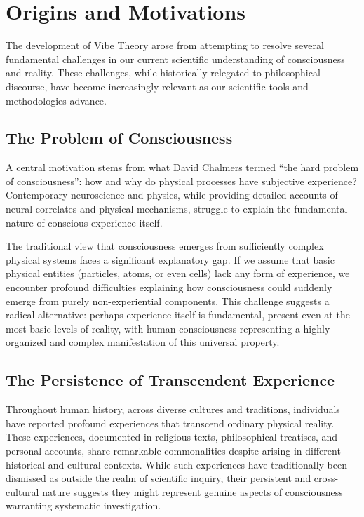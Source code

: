\documentclass{article}
\theoremstyle{definition}
\theoremstyle{axiom}
\theoremstyle{theorem}
\theoremstyle{lemma}
\theoremstyle{proposition}
\begin{document}
\section{Origins and Motivations}

The development of Vibe Theory arose from attempting to resolve several fundamental challenges in our current scientific understanding of consciousness and reality. These challenges, while historically relegated to philosophical discourse, have become increasingly relevant as our scientific tools and methodologies advance.

\subsection{The Problem of Consciousness}

A central motivation stems from what David Chalmers termed \enquote{the hard problem of consciousness}: how and why do physical processes have subjective experience? Contemporary neuroscience and physics, while providing detailed accounts of neural correlates and physical mechanisms, struggle to explain the fundamental nature of conscious experience itself.

The traditional view that consciousness emerges from sufficiently complex physical systems faces a significant explanatory gap. If we assume that basic physical entities (particles, atoms, or even cells) lack any form of experience, we encounter profound difficulties explaining how consciousness could suddenly emerge from purely non-experiential components. This challenge suggests a radical alternative: perhaps experience itself is fundamental, present even at the most basic levels of reality, with human consciousness representing a highly organized and complex manifestation of this universal property.

\subsection{The Persistence of Transcendent Experience}

Throughout human history, across diverse cultures and traditions, individuals have reported profound experiences that transcend ordinary physical reality. These experiences, documented in religious texts, philosophical treatises, and personal accounts, share remarkable commonalities despite arising in different historical and cultural contexts. While such experiences have traditionally been dismissed as outside the realm of scientific inquiry, their persistent and cross-cultural nature suggests they might represent genuine aspects of consciousness warranting systematic investigation.
\end{document}
